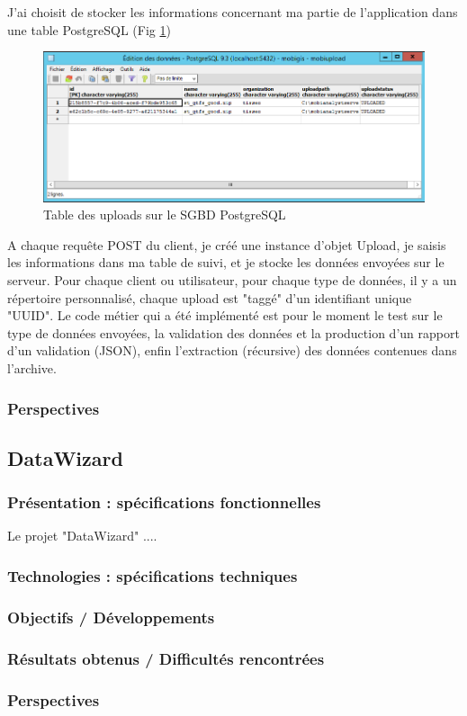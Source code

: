 J'ai choisit de stocker les informations concernant ma partie de l'application dans une table PostgreSQL (Fig \ref{TablePostgres})\\
\begin{figure}[!h]
\centering
\includegraphics[width=14cm]{images/tablePostgres_mobiupload_small.png}
\caption{\label{TablePostgres}Table des uploads sur le SGBD PostgreSQL}
\end{figure} 

A chaque requête POST du client, je créé une instance d'objet Upload, je saisis les informations dans ma table de suivi, et je stocke les données envoyées sur le serveur. Pour chaque client ou utilisateur, pour chaque type de données, il y a un répertoire personnalisé, chaque upload est "taggé" d'un identifiant unique "UUID".
Le code métier qui a été implémenté est pour le moment le test sur le type de données envoyées, la validation des données et la production d'un rapport d'un validation (JSON), enfin l'extraction (récursive) des données contenues dans l'archive.\\

\subsubsection{Perspectives}



\subsection{DataWizard}

\subsubsection{Présentation : spécifications fonctionnelles}

Le projet "DataWizard" ....\\

\subsubsection{Technologies : spécifications techniques}


\subsubsection{Objectifs / Développements}


\subsubsection{Résultats obtenus / Difficultés rencontrées}


\subsubsection{Perspectives}

